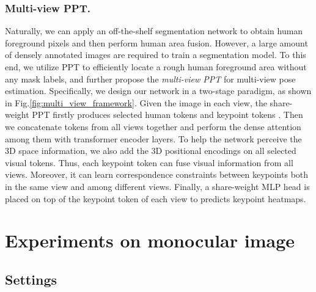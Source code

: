 \documentclass[runningheads]{llncs}
\begin{document}
\subsubsection{Multi-view PPT. }
Naturally, we can apply an off-the-shelf segmentation network \cite{he2017mask} to obtain human foreground pixels and then perform human area fusion. However, a large amount of densely annotated images are required to train a segmentation model. 
To this end, we utilize PPT to efficiently locate a rough human foreground area without any mask labels, and further propose the \textit{multi-view PPT} for multi-view pose estimation. 
Specifically, we design our network in a two-stage paradigm, as shown in Fig.\ref{fig:multi_view_framework}.  
Given the image  in each view, the share-weight PPT firstly produces selected human tokens  and keypoint tokens . 
Then we concatenate tokens from all views together and perform the dense attention among them with  transformer encoder layers. 
To help the network perceive the 3D space information, we also add the 3D positional encodings \cite{ma2021transfusion} on all selected visual tokens. 
Thus, each keypoint token can fuse visual information from all views.  Moreover, it can learn correspondence constraints between keypoints both in the same view and among different views. 
Finally, a share-weight MLP head is placed on top of the keypoint token of each view to predicts keypoint heatmaps. 















\vspace{-0.5em}
\section{Experiments on monocular image}
\vspace{-0.5em}

\subsection{Settings} 
\end{document}
